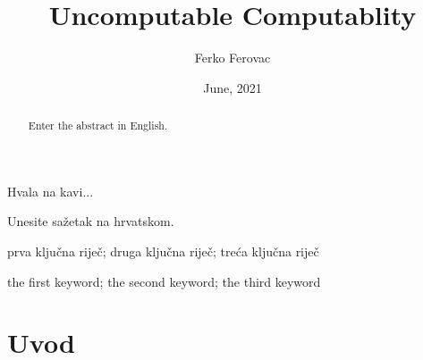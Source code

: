 \documentclass[zavrsnirad]{fer}
\title{Uncomputable Computablity}
\author{Ferko Ferovac}
\date{June, 2021}
\begin{document}
  \maketitle






  \begin{zahvale}
    Hvala na kavi...
  \end{zahvale}


  \mainmatter



  \begin{sazetak}
    Unesite sažetak na hrvatskom.

    \blindtext
  \end{sazetak}

  \begin{kljucnerijeci}
    prva ključna riječ; druga ključna riječ; treća ključna riječ
  \end{kljucnerijeci}


  \begin{abstract}
    Enter the abstract in English.

    \blindtext
  \end{abstract}

  \begin{keywords}
    the first keyword; the second keyword; the third keyword
  \end{keywords}


  \tableofcontents


  \chapter{Uvod}
  \label{pog:uvod}
\end{document}
